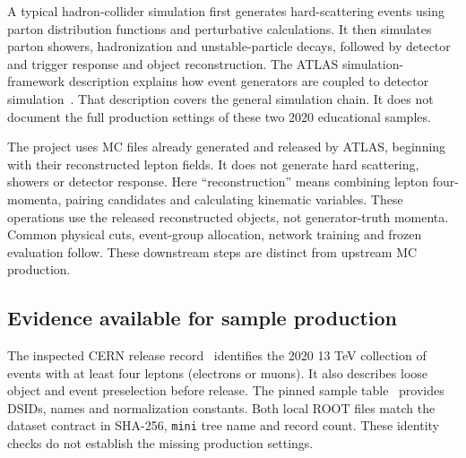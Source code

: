 \documentclass[11pt,a4paper]{article}
\begin{document}
A typical hadron-collider simulation first generates hard-scattering events using parton distribution functions and perturbative calculations. It then simulates parton showers, hadronization and unstable-particle decays, followed by detector and trigger response and object reconstruction.
The ATLAS simulation-framework description explains how event generators are coupled to detector simulation~\cite{ATLASSimulation}.
That description covers the general simulation chain. It does not document the full production settings of these two 2020 educational samples.

The project uses MC files already generated and released by ATLAS, beginning with their reconstructed lepton fields.
It does not generate hard scattering, showers or detector response.
Here ``reconstruction'' means combining lepton four-momenta, pairing candidates and calculating kinematic variables. These operations use the released reconstructed objects, not generator-truth momenta.
Common physical cuts, event-group allocation, network training and frozen evaluation follow.
These downstream steps are distinct from upstream MC production.

\subsection{Evidence available for sample production}
The inspected CERN release record~\cite{OpenData} identifies the 2020 13 TeV collection of events with at least four leptons (electrons or muons). It also describes loose object and event preselection before release.
The pinned sample table~\cite{SampleInfo} provides DSIDs, names and normalization constants.
Both local ROOT files match the dataset contract in SHA-256, \texttt{mini} tree name and record count. These identity checks do not establish the missing production settings.
\end{document}
